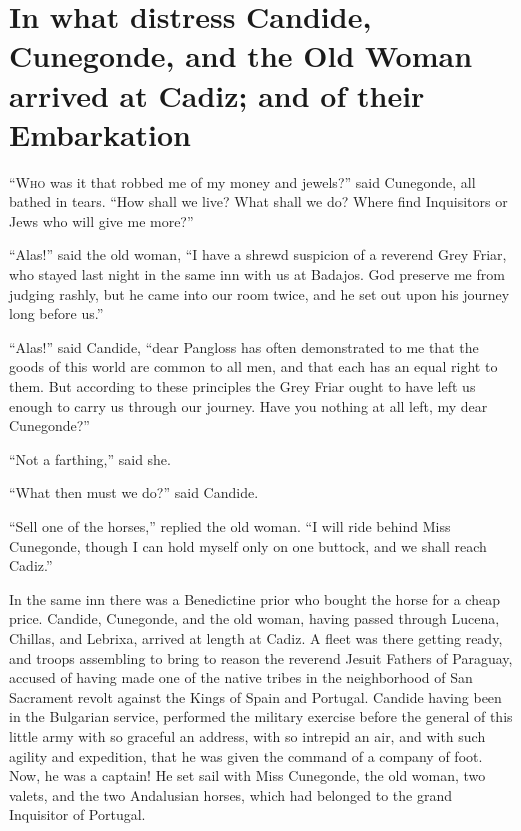 \vspace{1cm}
\begingroup
\let\clearpage\relax
\chapter{In what distress Candide, Cunegonde, and the Old Woman arrived at Cadiz; and of their Embarkation}
\thispagestyle{pter}
\endgroup
\vspace{-1cm}
\lettrine[lraise=0.1,nindent=0em,slope=-.5em]{``W}{ho} was it that robbed me of my money and jewels?'' said Cunegonde, all bathed in tears. ``How shall we live? What shall we do? Where find Inquisitors or Jews who will give me more?''

``Alas!'' said the old woman, ``I have a shrewd suspicion of a reverend Grey Friar, who stayed last night in the same inn with us at Badajos. God preserve me from judging rashly, but he came into our room twice, and he set out upon his journey long before us.''

``Alas!'' said Candide, ``dear Pangloss has often demonstrated to me that the goods of this world are common to all men, and that each has an equal right to them. But according to these principles the Grey Friar ought to have left us enough to carry us through our journey. Have you nothing at all left, my dear Cunegonde?''

``Not a farthing,'' said she.

``What then must we do?'' said Candide.

``Sell one of the horses,'' replied the old woman. ``I will ride behind Miss Cunegonde, though I can hold myself only on one buttock, and we shall reach Cadiz.''

In the same inn there was a Benedictine prior who bought the horse for a cheap price. Candide, Cunegonde, and the old woman, having passed through Lucena, Chillas, and Lebrixa, arrived at length at Cadiz. A fleet was there getting ready, and troops assembling to bring to reason the reverend Jesuit Fathers of Paraguay, accused of having made one of the native tribes in the neighborhood of San Sacrament revolt against the Kings of Spain and Portugal. Candide having been in the Bulgarian service, performed the military exercise before the general of this little army with so graceful an address, with so intrepid an air, and with such agility and expedition, that he was given the command of a company of foot. Now, he was a captain! He set sail with Miss Cunegonde, the old woman, two valets, and the two Andalusian horses, which had belonged to the grand Inquisitor of Portugal.

